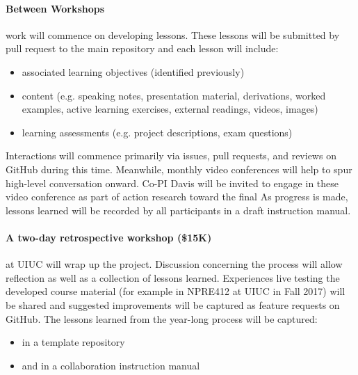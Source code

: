 \documentclass[11pt]{article}
\begin{document}
          \paragraph{Between Workshops} work will commence on developing 
          lessons. These lessons will be submitted by pull request to the main 
          repository and each lesson will include:
          \begin{itemize} 
                  \item associated learning objectives (identified previously)
                \item content (e.g. speaking notes, presentation material, 
                        derivations, worked examples, active learning  
                          exercises, external readings, videos, images)
                  \item learning assessments (e.g. project descriptions, exam questions) 
          \end{itemize} 

          Interactions will commence primarily via issues, pull requests, and 
          reviews on GitHub during this time. Meanwhile, monthly video 
          conferences will help to spur high-level conversation onward.
          Co-PI Davis will be invited to engage in these video conference as 
          part of action research toward the final 
          As progress is made, lessons learned will be recorded by all 
          participants in a draft instruction manual. 

          \paragraph{A two-day retrospective workshop (\$15K)} at UIUC will wrap up the 
          project. Discussion concerning the process will allow reflection as 
          well as a collection of lessons learned.
          Experiences live testing the developed course material (for example 
          in NPRE412 at UIUC in Fall 2017) will be shared and suggested 
          improvements will be captured as feature requests on GitHub.  
          The lessons learned from the year-long process will be captured:
          
          \begin{itemize}
                  \item in a template repository 
                  \item and in a collaboration instruction manual 
          \end{itemize}
\end{document}
